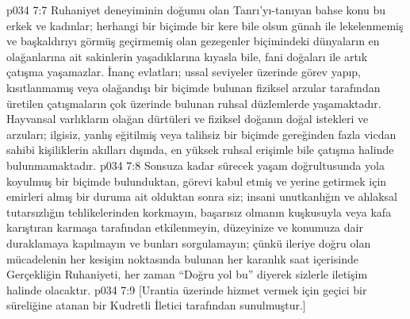 \vs p034 7:7 Ruhaniyet deneyiminin doğumu olan Tanrı’yı\hyp{}tanıyan bahse konu bu erkek ve kadınlar; herhangi bir biçimde bir kere bile olsun günah ile lekelenmemiş ve başkaldırıyı görmüş geçirmemiş olan gezegenler biçimindeki dünyaların en olağanlarına ait sakinlerin yaşadıklarına kıyasla bile, fani doğaları ile artık çatışma yaşamazlar. İnanç evlatları; ussal seviyeler üzerinde görev yapıp, kısıtlanmamış veya olağandışı bir biçimde bulunan fiziksel arzular tarafından üretilen çatışmaların çok üzerinde bulunan ruhsal düzlemlerde yaşamaktadır. Hayvansal varlıkların olağan dürtüleri ve fiziksel doğanın doğal istekleri ve arzuları; ilgisiz, yanlış eğitilmiş veya talihsiz bir biçimde gereğinden fazla vicdan sahibi kişiliklerin akılları dışında, en yüksek ruhsal erişimle bile çatışma halinde bulunmamaktadır.
\vs p034 7:8 Sonsuza kadar sürecek yaşam doğrultusunda yola koyulmuş bir biçimde bulunduktan, görevi kabul etmiş ve yerine getirmek için emirleri almış bir duruma ait olduktan sonra siz; insani unutkanlığın ve ahlaksal tutarsızlığın tehlikelerinden korkmayın, başarısız olmanın kuşkusuyla veya kafa karıştıran karmaşa tarafından etkilenmeyin, düzeyinize ve konumuza dair duraklamaya kapılmayın ve bunları sorgulamayın; çünkü ileriye doğru olan mücadelenin her kesişim noktasında bulunan her karanlık saat içerisinde Gerçekliğin Ruhaniyeti, her zaman “Doğru yol bu” diyerek sizlerle iletişim halinde olacaktır.
\vs p034 7:9 [Urantia üzerinde hizmet vermek için geçici bir süreliğine atanan bir Kudretli İletici tarafından sunulmuştur.]
